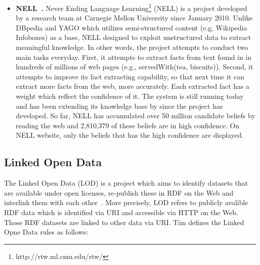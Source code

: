 \begin{itemize}
\item \textbf{NELL~\cite{DBLP:conf/wsdm/CarlsonBWHM10}.} Never Ending Language Learning\footnote{http://rtw.ml.cmu.edu/rtw/} (NELL) is a project developed by a research team at Carnegie Mellon University since January 2010. Unlike DBpedia and YAGO which utilizes semi-structured content (e.g, Wikipedia Infoboxes)  as a base, NELL designed to exploit unstructured data to extract meaningful knowledge. In other words, the project attempts to conduct two main tasks everyday.
First, it attempts to extract facts from text found in in hundreds of millions of web pages (e.g., servedWith(tea, biscuits)).
Second, it attempts to improve its fact extracting capability, so that next time it can extract more facts from the web, more accurately. Each extracted fact has a weight which reflect the confidence of it. The system is still running today and has been extending its knowledge base by since the project has developed. So far, NELL has accumulated over 50 million candidate beliefs by reading the web and 2,810,379 of these beliefs are in high confidence. On NELL website, only the beliefs that has the high confidence are displayed. 
\end{itemize}
\subsection{Linked Open Data}
The Linked Open Data (LOD) is a project which aims to identify datasets that are available under open licenses, re-publish
these in RDF on the Web and interlink them with each other~\cite{2008}. More precisely, LOD refers to publicly avalible RDF data which is identified via URI and accessible via HTTP on the Web. Those RDF datasets are linked to other data via URI. Tim defines the Linked Opne Data rules as follows:





